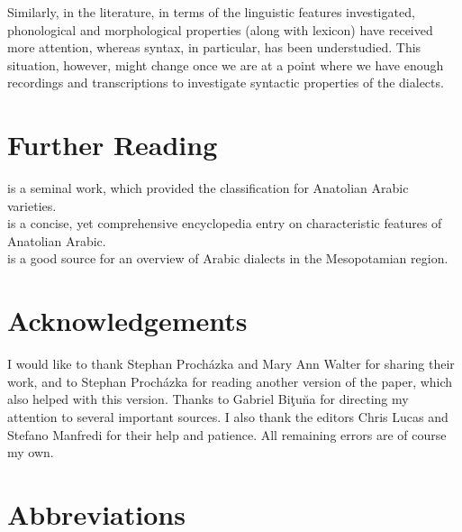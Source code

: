 \documentclass[output=paper]{langsci/langscibook}
\begin{document}
Similarly, in the literature, in terms of the linguistic features investigated, phonological and morphological properties (along with lexicon) have received more attention, whereas syntax, in particular, has been understudied. This situation, however, might change once we are at a point where we have enough recordings and transcriptions to investigate syntactic properties of the dialects. 

\section*{Further Reading}
 
\citet{Jastrow1978} is a seminal work, which provided the classification for Anatolian Arabic varieties. \\
\citet{Jastrow2011anatolian} is a concise, yet comprehensive encyclopedia entry on characteristic features of Anatolian Arabic.\\
\noindent \citet{Talay2011} is a good source for an overview of Arabic dialects in the Mesopotamian region.

\section*{Acknowledgements}
I would like to thank Stephan Proch\'{a}zka and Mary Ann Walter for sharing their work, and to Stephan Proch\'{a}zka for reading another version of the paper, which also helped with this version. Thanks to Gabriel Bi\c{t}u\u{n}a for directing my attention to several important sources. I also thank the editors Chris Lucas and Stefano Manfredi for their help and patience. All remaining errors are of course my own.  

\section*{Abbreviations}
\end{document}
